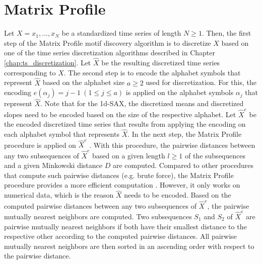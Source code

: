 \section{Matrix Profile} \label{description_matrix_profile}
Let $X = x_1, ..., x_N$ be a standardized time series of length $N \geq 1$. Then, the first step of the Matrix Profile motif discovery algorithm is to discretize $X$ based on one of the time series discretization algorithms described in Chapter \ref{chap:ts_discretization}. Let $\hat{X}$ be the resulting discretized time series corresponding to $X$. The second step is to encode the alphabet symbols that represent $\hat{X}$ based on the alphabet size $a \geq 2$ used for discretization. For this, the encoding $e(\alpha_j) = j-1 \ (1 \leq j \leq a)$ is applied on the alphabet symbols $\alpha_j$ that represent $\hat{X}$. Note that for the \ac{1d-SAX}, the discretized means and discretized slopes need to be encoded based on the size of the respective alphabet. Let $\hat{X}^e$ be the encoded discretized time series that results from applying the encoding on each alphabet symbol that represents $\hat{X}$. \newline
In the next step, the Matrix Profile procedure is applied on $\hat{X}^e$ \cite{Matrix_Profile}. With this procedure, the pairwise distances between any two subsequences of $\hat{X}^e$ based on a given length $l \geq 1$ of the subsequences and a given Minkowski distance $D$ are computed. Compared to other procedures that compute such pairwise distances (e.g. brute force), the Matrix Profile procedure provides a more efficient computation \cite{Matrix_Profile}. However, it only works on numerical data, which is the reason $\hat{X}$ needs to be encoded. \newline
Based on the computed pairwise distances between any two subsequences of $\hat{X}^e$, the pairwise mutually nearest neighbors are computed. Two subsequences $S_1$ and $S_2$ of $\hat{X}^e$ are pairwise mutually nearest neighbors if both have their smallest distance to the respective other according to the computed pairwise distances. All pairwise mutually nearest neighbors are then sorted in an ascending order with respect to the pairwise distance. \newline
